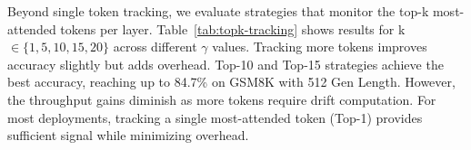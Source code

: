 \documentclass{article} %
\theoremstyle{definition}
\theoremstyle{remark}
\begin{document}
Beyond single token tracking, we evaluate strategies that monitor the top-k most-attended tokens per layer. Table~\ref{tab:topk-tracking} shows results for k $\in \{1, 5, 10, 15, 20\}$ across different $\gamma$ values. Tracking more tokens improves accuracy slightly but adds overhead. Top-10 and Top-15 strategies achieve the best accuracy, reaching up to 84.7\% on GSM8K with 512 Gen Length. However, the throughput gains diminish as more tokens require drift computation. For most deployments, tracking a single most-attended token (Top-1) provides sufficient signal while minimizing overhead.

\begin{table}[h]
\centering
\caption{Sensitivity to the number of tracked tokens (Top-k) across different attention thresholds on GSM8K with 512 Gen Length (LLaDA-1.5). Each cell shows accuracy (top) and throughput in t/s (bottom).}
\label{tab:topk-tracking}
\vspace{-0.1in}
\end{table}
\end{document}
